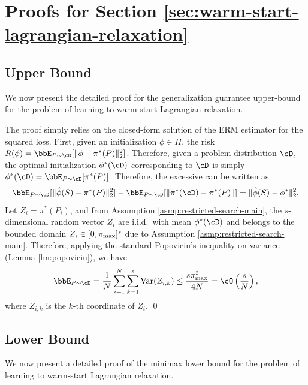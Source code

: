 \section{Proofs for Section \ref{sec:warm-start-lagrangian-relaxation}} \label{apx:warm-start-lagrangian-relaxation}
\subsection{Upper Bound} \label{apx:upper-bound-warm-start}
We now present the detailed proof for the generalization guarantee upper-bound for the problem of learning to warm-start Lagrangian relaxation. 

    The proof simply relies on the closed-form solution of the ERM estimator for the squared loss. First, given an initialization $\phi \in \Pi$, the risk $R(\phi) = \bbE_{P \sim \cD}[\|\phi - \pi^*(P)\|_2^2]$. Therefore, given a problem distribution $\cD$, the optimal initialization $\phi^*(\cD)$ corresponding to $\cD$ is simply $\phi^*(\cD) = \bbE_{P \sim \cD}[\pi^*(P)]$. Therefore, the excessive can be written as 
    \[
        \bbE_{P \sim \cD}[\|\hat{\phi}(S) - \pi^*(P)\|_2^2] - \bbE_{P \sim \cD}[\|\pi^*(\cD) - \pi^*(P)\|] = \|\hat{\phi}(S) - \phi^*\|_2^2.
    \]
    Let $Z_i = \pi^*(P_i)$, and from Assumption \ref{asmp:restricted-search-main}, the $s$-dimensional random vector $Z_i$ are i.i.d.~with mean $\phi^*(\cD)$ and belongs to the bounded domain $Z_i \in [0, \pi_\textup{max}]^s$ due to Assumption \ref{asmp:restricted-search-main}. { Therefore, applying the standard Popoviciu's inequality on variance (Lemma \ref{lm:popoviciu}), we have}
    \[
        \bbE_{P \sim \cD} = \frac{1}{N}\sum_{i = 1}^N \sum_{k = 1}^s \textup{Var}(Z_{i, k})\leq \frac{s \pi^2_\textup{max}}{4N} = \cO\left(\frac{s}{N}\right),
    \]
    where $Z_{i, k}$ is the $k$-th coordinate of $Z_i$.
\qed

\subsection{Lower Bound}
We now present a detailed proof of the minimax lower bound for the problem of learning to warm-start Lagrangian relaxation. 

